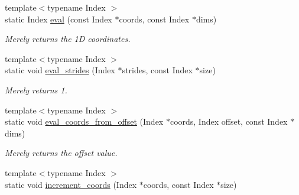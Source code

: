 \begin{DoxyCompactItemize}
\item 
\hypertarget{struct_d_o_1_1_offset_3_011_00_01_row_major_01_4_a1ffa69ab4cc1df64eaa174cfbfb1839d}{{\footnotesize template$<$typename Index $>$ }\\static Index \hyperlink{struct_d_o_1_1_offset_3_011_00_01_row_major_01_4_a1ffa69ab4cc1df64eaa174cfbfb1839d}{eval} (const Index $\ast$coords, const Index $\ast$dims)}\label{struct_d_o_1_1_offset_3_011_00_01_row_major_01_4_a1ffa69ab4cc1df64eaa174cfbfb1839d}

\begin{DoxyCompactList}\small\item\em Merely returns the 1\-D coordinates. \end{DoxyCompactList}\item 
\hypertarget{struct_d_o_1_1_offset_3_011_00_01_row_major_01_4_ad02911d67da0ad2bcf95bf5957f37553}{{\footnotesize template$<$typename Index $>$ }\\static void \hyperlink{struct_d_o_1_1_offset_3_011_00_01_row_major_01_4_ad02911d67da0ad2bcf95bf5957f37553}{eval\-\_\-strides} (Index $\ast$strides, const Index $\ast$size)}\label{struct_d_o_1_1_offset_3_011_00_01_row_major_01_4_ad02911d67da0ad2bcf95bf5957f37553}

\begin{DoxyCompactList}\small\item\em Merely returns 1. \end{DoxyCompactList}\item 
\hypertarget{struct_d_o_1_1_offset_3_011_00_01_row_major_01_4_a0b52d46c505c64599af0ed217401d2fe}{{\footnotesize template$<$typename Index $>$ }\\static void \hyperlink{struct_d_o_1_1_offset_3_011_00_01_row_major_01_4_a0b52d46c505c64599af0ed217401d2fe}{eval\-\_\-coords\-\_\-from\-\_\-offset} (Index $\ast$coords, Index offset, const Index $\ast$dims)}\label{struct_d_o_1_1_offset_3_011_00_01_row_major_01_4_a0b52d46c505c64599af0ed217401d2fe}

\begin{DoxyCompactList}\small\item\em Merely returns the offset value. \end{DoxyCompactList}\item 
\hypertarget{struct_d_o_1_1_offset_3_011_00_01_row_major_01_4_acbe7b75b289ed1e202180fd94a2a707c}{{\footnotesize template$<$typename Index $>$ }\\static void \hyperlink{struct_d_o_1_1_offset_3_011_00_01_row_major_01_4_acbe7b75b289ed1e202180fd94a2a707c}{increment\-\_\-coords} (Index $\ast$coords, const Index $\ast$size)}\label{struct_d_o_1_1_offset_3_011_00_01_row_major_01_4_acbe7b75b289ed1e202180fd94a2a707c}


\end{DoxyCompactItemize}
